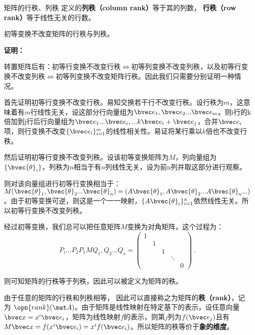 


\begin{definition}{矩阵的行秩、列秩}
定义的\textbf{列秩（column rank）}等于其的列数， \textbf{行秩（row rank）}等于线性无关的行数。
\end{definition}
\begin{theorem}{}
初等变换不改变矩阵的行秩与列秩。
\end{theorem}
\textbf{证明：}

转置矩阵后有：初等行变换不改变行秩$\Leftrightarrow$初等列变换不改变列秩，以及初等行变换不改变列秩$\Leftrightarrow$初等列变换不改变矩阵行秩。因此我们只需要分别证明一种情况。

首先证明初等行变换不改变行秩。易知交换若干行不改变行秩。设行秩为$m$，这意味着有$m$行线性无关，设这部分行向量组为$\bvec e_1,\bvec e_2...\bvec e_m$。则i行的k倍加到j行后行向量组为$\bvec e_1...\bvec e_i,...k\bvec e_i+\bvec e_j$，合并$\bvec e_i$项，则行变换不改变$\{\bvec e_i\}^m_{i=1}$的线性相关性。易证将某行乘以$k$倍也不改变行秩。

然后证明初等行变换不改变列秩。设该初等变换矩阵为$M$，列向量组为$\{\bvec{\theta}_i\}$，列秩为$n$相当于有$n$列线性无关，设为前n列并取这部分进行观察。

则对该向量组进行初等行变换相当于：$M(\bvec{\theta}_1,\bvec{\theta}_2...\bvec{\theta}_n)=(A\bvec{\theta}_1,A\bvec{\theta}_2...A\bvec{\theta}_n...)$。由于初等变换可逆，则这是一个一一映射，$\{A\bvec{\theta}_i\}_{i=1}^n$依然线性无关。所以初等行变换不改变列秩。

经过初等变换，我们总可以把任意矩阵$M$变换为对角矩阵，这个过程为：
\begin{equation}\label{eq_MatRnk_2}
P_i...P_2P_1MQ_1,Q_2...Q_s=
\left(\begin{array}{lllll}
1 & & & & \\
& 1 & & & \\
& & 1 & & \\
& & & \ddots & \\
& & & & 0
\end{array}\right)~.
\end{equation}



则可知矩阵的行秩等于列秩，因此可以被定义为矩阵的秩。

\begin{definition}{}
由于任意的矩阵的行秩和列秩相等， 因此可以直接称之为矩阵的\textbf{秩（rank）}，记为 $\opn{rank}(\mat A)$。由于矩阵是线性映射在特定基下的表示，设任意向量$\bvec x=x^i\bvec e_i$，矩阵为线性映射$f$的表示，则第$j$列为$f(\bvec e_j)$且有$M\bvec x=f(x^i\bvec  e_i)=x^if(\bvec e_i)$。所以矩阵的秩等价于\textbf{象的维度}。
\end{definition}




